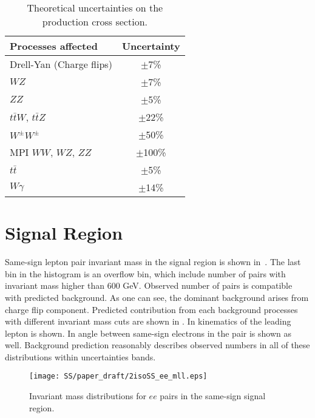 \begin{table}[ht]
\caption{Theoretical uncertainties on the production cross section.}
\begin{center}
\begin{tabular}{l|c}
Processes affected & Uncertainty \\
\hline
 Drell-Yan (Charge flips) & $\pm$7\% \\
 $WZ$ & $\pm$7\% \\
 $ZZ$ & $\pm$5\% \\
 $t\bar{t}W$, $t\bar{t}Z$  & $\pm$22\% \\
 $W^{\pm}W^{\pm}$ & $\pm$50\% \\
 MPI $WW$, $WZ$, $ZZ$ & $\pm$100\% \\
 $t\bar{t}$ & $\pm$5\% \\
 $W\gamma$ & $\pm$14\% \\
\end{tabular}
\end{center}
\label{tab:systematics_common}
\end{table}



\section{Signal Region}
\label{sec:ss_signalRegion}

Same-sign lepton pair invariant mass in the signal region is shown in~.
The last bin in the histogram is an overflow bin, which include number of pairs with invariant mass higher than 600 GeV.
Observed number of pairs is compatible with predicted background.
As one can see, the dominant background arises from charge flip component.
Predicted contribution from each background processes with different invariant mass cuts are shown in .
In  kinematics of the leading lepton is shown. 
In  angle between same-sign electrons in the pair is shown as well.
Background prediction reasonably describes observed numbers in all of these distributions within uncertainties bands.

\begin{figure}[h]
\begin{center}
\texttt{[image: SS/paper\_draft/2isoSS\_ee\_mll.eps]}
\caption{\toDo Invariant mass distributions for $ee$ pairs in the same-sign signal region.}
\label{fig:signal_mass}
\end{center}
\end{figure}

